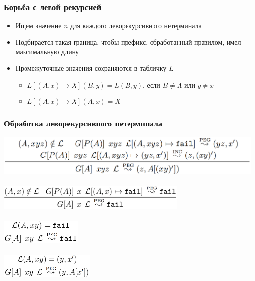 \documentclass{beamer}
\begin{document}
\begin{frame}[fragile]
  \transwipe[direction=90]
  \frametitle{Борьба с левой рекурсией}
\begin{itemize}
  \item Ищем значение $n$ для каждого леворекурсивного нетерминала
  \item Подбирается такая граница, чтобы префикс, обработанный правилом, имел 
максимальную длину
  \item Промежуточные значения сохраняются в табличку $L$
  \begin{itemize}
    \item $L[(A, x) \rightarrow X](B, y) = L(B, y)$, если $B \neq A$ или $y 
\neq x$
    \item $L[(A, x) \rightarrow X](A, x) = X$
  \end{itemize}
\end{itemize}
\end{frame}

\begin{frame}[fragile]
  \transwipe[direction=90]
  \frametitle{Обработка леворекурсивного нетерминала}
\begin{center}
  \includegraphics[width=1.0\textwidth]{pics/lvar1}  \\~\\     \pause
  \includegraphics[width=0.7\textwidth]{pics/lvar2}  \\~\\     \pause 
  \includegraphics[width=0.3\textwidth]{pics/lvar3}  \\~\\     \pause
  \includegraphics[width=0.35\textwidth]{pics/lvar4}  
\end{center}
\end{frame}
\end{document}
